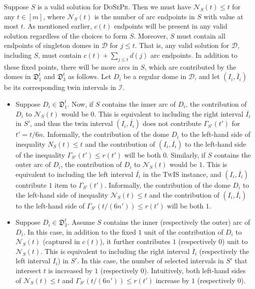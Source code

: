 \documentclass[letterpaper,11pt]{article}
\newcommand{\tis}{\textsc{TwIS}\xspace}
\newcommand{\dspr}{\textsc{DoSePr}\xspace}
\begin{document}
Suppose $S$ is a valid solution for \dspr. Then we must have $\mathcal{N}_S(t) \leq t$ for any $t\in[m]$, where $\mathcal{N}_S(t)$ is the number of arc endpoints in $S$ with value at most $t$. As mentioned earlier, $c(t)$ endpoints will be present in any valid solution regardless of the choices to form $S$. Moreover, $S$ must contain all endpoints of singleton domes in $\mathcal{D}$ for $j\leq t$. That is, any valid solution for $\mathcal{D}$, including $S$, must contain $c(t) + \sum_{j\leq t} d(j) $ arc endpoints.  
In addition to these fixed points, there will be more arcs in $S$, which are contributed by the domes in $\mathfrak{D}^t_1$ and $\mathfrak{D}^t_3$ as follows.
    Let $D_i$ be a regular dome in $\mathcal{D}$, and let $(I_i,\overline{I}_i)$ be its corresponding twin intervals in $\mathcal{I}$.
\begin{itemize}
    \item Suppose $D_i\in \mathfrak{D}^t_1$. Now, if  
    $S$ contains the inner 
    arc of $D_i$, the contribution of $D_i$ to $\mathcal{N}_S(t)$ would be $0$. 
    This is equivalent to including the right interval $\overline{I_i}$ in $S'$, and thus 
    the 
    twin interval $(I_i,\overline{I_i})$ does not contribute $\Gamma_{S'}(t')$ for $t'=t/6n$. Informally, the contribution of the dome $D_i$ to the left-hand side of inequality $N_S(t) \leq t$ and the contribution of $(I_i,\overline{I_i})$ to the left-hand side of the inequality $\Gamma_{S'}(t')\leq r(t')$ 
    will be both $0$. 
    Similarly, if $S$ contains the outer arc of $D_i$, the contribution of $D_i$ to $\mathcal{N}_S(t)$ would be $1$.
    This is equivalent to including the left interval $\overline{I_i}$ in the \tis instance, and  $(I_i,\overline{I_i})$ contribute $1$ item to 
    $\Gamma_{S'}(t')$. Informally, the contribution of the dome $D_i$ to the left-hand side of inequality $\mathcal{N}_S(t) \leq t$ and the contribution of $(I_i,\overline{I_i})$ to the left-hand side of 
    $\Gamma_{S'}(t/{(6n')}) \leq r(t')$
    will be both $1$.  

    \item Suppose $D_i\in \mathfrak{D}^t_3$. Assume $S$ contains the inner (respectively the outer) arc of $D_i$. In this case, in addition to the fixed $1$ unit of the contribution of $D_i$ to $\mathcal{N}_S(t)$ (captured in $c(t)$), it further contributes $1$ (respectively $0$) unit to $\mathcal{N}_S(t)$. 
    This is equivalent to including the right interval $\overline{I}_i$ (respectively the left interval $I_i$) in $S'$. 
    In this case, the number of selected intervals in $S'$ that intersect $t$ is increased by $1$ (respectively $0$). Intuitively, both left-hand sides of $\mathcal{N}_S(t) \leq t$ and $\Gamma_{S'}(t/{(6n')}) \leq r(t')$ increase by $1$ (respectively $0$). 
\end{itemize}
\end{document}
